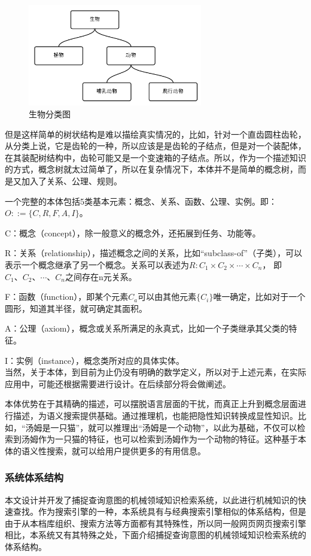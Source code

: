 \documentclass[12pt,a4paper]{article}
\begin{document}
	\begin{figure}[htbp] 
	\centering\includegraphics[width=3in]{fig/biotax.png} 
	\caption{生物分类图}\label{fig:生物分类} 
	\end{figure}	
	
	但是这样简单的树状结构是难以描绘真实情况的，比如，针对一个直齿圆柱齿轮，从分类上说，它是齿轮的一种，所以应该是是齿轮的子结点，但是对一个装配体，在其装配树结构中，齿轮可能又是一个变速箱的子结点。所以，作为一个描述知识的方式，概念树就太过简单了，所以在复杂情况下，本体并不是简单的概念树，而是又加入了关系、公理、规则。
	
	一个完整的本体包括5类基本元素：概念、关系、函数、公理、实例。即：$O::=\{C,R,F,A,I\}$。\cite{Chen2010}
	
	C：概念（concept），除一般意义的概念外，还拓展到任务、功能等。
	
	R：关系（relationship），描述概念之间的关系，比如“subclass-of”（子类），可以表示一个概念继承了另一个概念。关系可以表述为$ R:C_{1} \times C_{2} \times \cdots \times C_{n} $， 即$C_{1}、C_{2}、\cdots 、C_{n}$之间存在n元关系。
	
	F：函数（function），即某个元素$C_{a}$可以由其他元素$ \{C_{i}\} $唯一确定，比如对于一个圆形，知道其半径，就可确定其面积。
	
	A：公理（axiom），概念或关系所满足的永真式，比如一个子类继承其父类的特征。
	
	I：实例（instance），概念类所对应的具体实体。
	\\
	
	当然，关于本体，到目前为止仍没有明确的数学定义，所以对于上述元素，在实际应用中，可能还根据需要进行设计。在后续部分将会做阐述。
	
	本体优势在于其精确的描述，可以摆脱语言层面的干扰，而真正上升到概念层面进行描述，为语义搜索提供基础。通过推理机，也能把隐性知识转换成显性知识。比如，“汤姆是一只猫”，就可以推理出“汤姆是一个动物”，以此为基础，不仅可以检索到汤姆作为一只猫的特征，也可以检索到汤姆作为一个动物的特征。这种基于本体的语义性搜索，就可以给用户提供更多的有用信息。

		\subsubsection{系统体系结构}
	本文设计并开发了捕捉查询意图的机械领域知识检索系统，以此进行机械知识的快速查找。作为搜索引擎的一种，本系统具有与经典搜索引擎相似的体系结构，但是由于从本档库组织、搜索方法等方面都有其特殊性，所以同一般网页网页搜索引擎相比，本系统又有其特殊之处，下面介绍捕捉查询意图的机械领域知识检索系统的体系结构。
	
\end{document}
